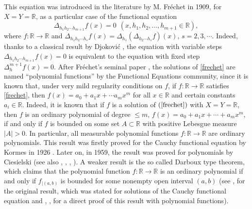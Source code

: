 \documentclass[10pt,a4paper]{amsart}
\theoremstyle{definition}
\begin{document}
This  equation was  introduced in the literature by M. Fr\'{e}chet in 1909, for $X=Y=\mathbb{R}$,  as a particular case of the functional equation  
\begin{equation}\label{fre}
\Delta_{h_1h_2\cdots h_{m+1}}f(x)=0 \ \ (x,h_1,h_2,\dots,h_{m+1}\in \mathbb{R}),
\end{equation}
where $f:\mathbb{R}\to\mathbb{R}$ and $\Delta_{h_1h_2\cdots h_s}f(x)=\Delta_{h_1}\left(\Delta_{h_2\cdots h_s}f\right)(x)$, $s=2,3,\cdots$. Indeed, thanks to a classical result by Djokovi\'{c} \cite{Dj}, the equation with variable steps 
$\Delta_{h_1h_2\cdots h_{m+1}}f(x)=0$ is equivalent to the equation with fixed step $\Delta^{m+1}_hf(x)=0$. After Fr\'{e}chet's 
seminal paper \cite{frechet}, the solutions of \eqref{frechet} are named ``polynomial functions'' by the Functional Equations community, since it is known that, under very mild regularity conditions on $f$, if $f:\mathbb{R}\to\mathbb{R}$ satisfies \eqref{frechet}, then $f(x)=a_0+a_1x+\cdots a_{m}x^{m}$ for all $x\in\mathbb{R}$ and certain constants $a_i\in\mathbb{R}$. Indeed, it is known that if $f$ is a solution of $(\ref{frechet})$ with $X=Y=\mathbb{R}$, then $f$ is an ordinary polynomial of degree $\leq m$, $f(x)=a_0+a_1x+\cdots+a_mx^m$, if and only if $f$ is bounded on some set $A\subset\mathbb{R}$  with positive Lebesgue measure $|A|>0$. In particular, all measurable polynomial functions $f:\mathbb{R}\to\mathbb{R}$ are ordinary polynomials. This result was firstly proved for the Cauchy functional equation by Kormes in 1926 \cite{kormes}. Later on, in 1959, the result was proved for polynomials by Ciesielski \cite{ciesielski} (see also \cite{kuczma1}, \cite{kurepa}, \cite{mckiernan}, \cite{laszlo1}). A weaker result is the so called Darboux type theorem, which claims that the polynomial function  $f:\mathbb{R}\to\mathbb{R}$ is an ordinary polynomial if and only if $f_{|(a,b)}$ is  bounded for some nonempty open interval $(a,b)$ (see \cite{darboux}, \cite{sanjuan} for the original result, which was stated for solutions of the Cauchy functional equation and \cite{almira_antonio}, \cite{AK_MJM},  \cite{laszlo1} for a direct proof of this result with polynomial functions).
\end{document}
